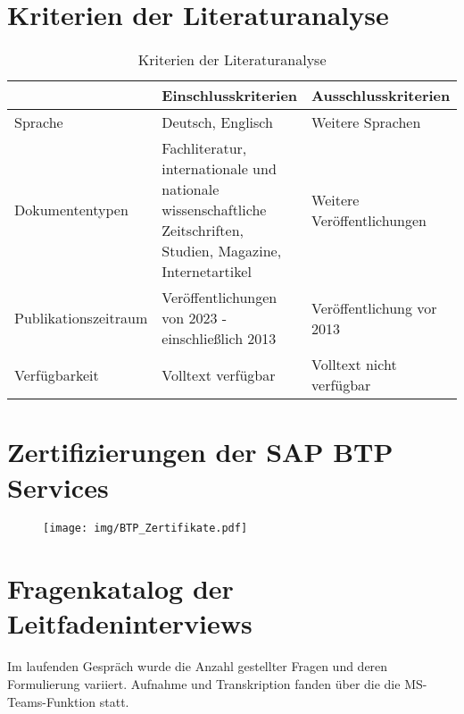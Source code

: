 \section{Kriterien der Literaturanalyse}
\begin{table}[ht]
    \begin{center}
    \begin{tabular}{|p{}|p{}|p{}|}
        \hline  & Einschlusskriterien & Ausschlusskriterien \\[0.5ex]
        \hline Sprache & Deutsch, Englisch & Weitere Sprachen\\
        \hline Dokumententypen & Fachliteratur, internationale und nationale wissenschaftliche Zeitschriften, Studien, Magazine, Internetartikel & Weitere Veröffentlichungen\\
        \hline Publikationszeitraum & Veröffentlichungen von 2023 - einschließlich 2013 & Veröffentlichung vor 2013\\
        \hline Verfügbarkeit & Volltext verfügbar & Volltext nicht verfügbar\\
        \hline
    \end{tabular}
    \end{center}
    \caption{Kriterien der Literaturanalyse}
    \label{tab:kriterien}
\end{table}   
\newpage

\section{Zertifizierungen der SAP BTP Services}
\label{sec:BTPZertifikate}
\begin{figure}[h]
    \centering
    \texttt{[image: img/BTP\_Zertifikate.pdf]}
    \label{fig:BTPZertifikate}
  \end{figure}
\newpage

\section{Fragenkatalog der Leitfadeninterviews}
\label{sec:Fragenkatalog}
Im laufenden Gespräch wurde die Anzahl gestellter Fragen und deren Formulierung variiert. Aufnahme und Transkription fanden über die die MS-Teams-Funktion statt.

